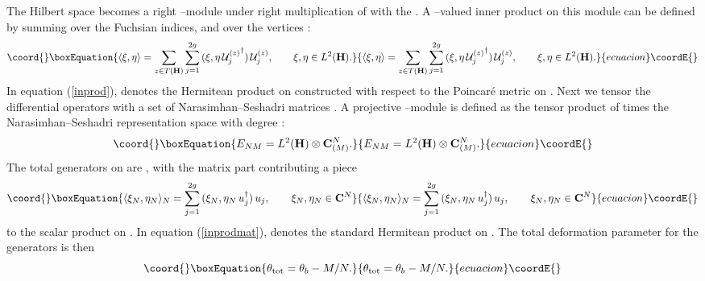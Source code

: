 \documentclass[a4paper,a4paper]{article}
\begin{document}
The Hilbert space \coordHE{}  becomes a right 
\coordHE{}--module under right multiplication of 
\coordHE{} with the \coordHE{}. A \coordHE{}--valued inner product \myHighlight{$\langle\,,\rangle$}\coordHE{} on this module 
can be defined by summing over the Fuchsian indices, 
and over the vertices \coordHE{}:  
\begin{equation}\coord{}\boxEquation{  
\langle \xi,\eta\rangle=\sum_{z\in T({\bf H})}\sum_{j=1}^{2g}\,  
(\xi,\eta\,{{\cal U}_j^{(z)}}^{\dagger})\,{\cal U}_j^{(z)},
\qquad \xi,\eta\in L^2({\bf H}).  
\label{inprod}
}{  
\langle \xi,\eta\rangle=\sum_{z\in T({\bf H})}\sum_{j=1}^{2g}\,  
(\xi,\eta\,{{\cal U}_j^{(z)}}^{\dagger})\,{\cal U}_j^{(z)},
\qquad \xi,\eta\in L^2({\bf H}).  
}{ecuacion}\coordE{}\end{equation}  
In equation (\ref{inprod}), \myHighlight{$(\,,)$}\coordHE{} denotes the Hermitean product 
on \coordHE{} constructed with respect to the Poincar\'e metric 
on \coordHE{}. Next we tensor the differential operators \coordHE{} 
with a set of Narasimhan--Seshadri matrices \coordHE{}. 
A projective \coordHE{}--module 
\coordHE{} is defined as the tensor product of \coordHE{}  
times the Narasimhan--Seshadri representation space \coordHE{} with degree \coordHE{}:
\begin{equation}\coord{}\boxEquation{
E_{NM}=L^2({\bf H})\otimes {\bf C}^N_{(M)}.
\label{totspace}
}{
E_{NM}=L^2({\bf H})\otimes {\bf C}^N_{(M)}.
}{ecuacion}\coordE{}\end{equation}
The total generators on \coordHE{} are \coordHE{}, 
with the matrix part contributing a piece
\begin{equation}\coord{}\boxEquation{  
\langle \xi_N,\eta_N\rangle_N=\sum_{j=1}^{2g}\,  
(\xi_N,\eta_N\,u_j^{\dagger})\,u_j, \qquad   \xi_N,\eta_N\in {\bf C}^N 
\label{inprodmat}
}{  
\langle \xi_N,\eta_N\rangle_N=\sum_{j=1}^{2g}\,  
(\xi_N,\eta_N\,u_j^{\dagger})\,u_j, \qquad   \xi_N,\eta_N\in {\bf C}^N 
}{ecuacion}\coordE{}\end{equation} 
to the scalar product on \coordHE{}. In equation (\ref{inprodmat}), \myHighlight{$(\,,)$}\coordHE{} denotes 
the standard Hermitean product on \coordHE{}. The total deformation parameter 
for the generators \coordHE{} is then
\begin{equation}\coord{}\boxEquation{  
\theta_{\rm tot}=\theta_b-M/N.  
\label{totdef} 
}{  
\theta_{\rm tot}=\theta_b-M/N.  
}{ecuacion}\coordE{}\end{equation}
  
\end{document}
